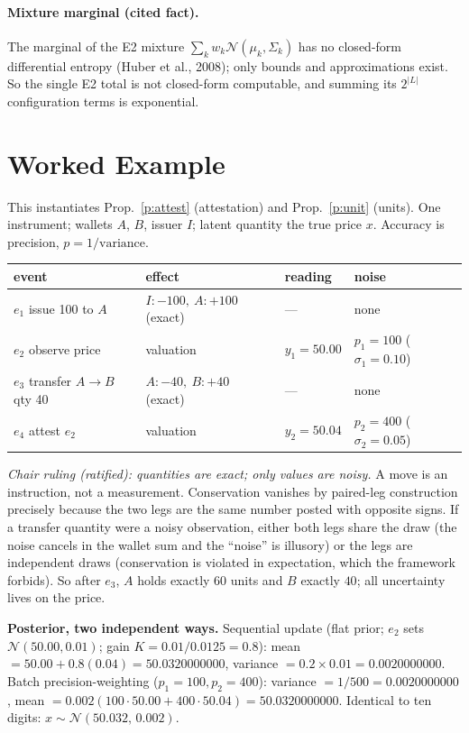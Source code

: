 \documentclass[11pt]{article}
\theoremstyle{definition}\newtheorem{definition}{Definition}
\theoremstyle{plain}\newtheorem{proposition}{Proposition}
\theoremstyle{remark}\newtheorem{remark}{Remark}
\newcommand{\Log}{L}
\newcommand{\ev}{e}                  %
\newcommand{\st}{x}                  %
\newcommand{\obs}{y}                 %
\newcommand{\acc}{p}                 %
\newcommand{\mean}{\mu}
\newcommand{\cov}{\Sigma}
\newcommand{\Ncal}{\mathcal{N}}
\begin{document}
\paragraph{Mixture marginal (cited fact).}
The marginal of the E2 mixture $\sum_k w_k\Ncal(\mean_k,\cov_k)$ has no closed-form differential
entropy (Huber et al., 2008); only bounds and approximations exist. So the single E2 total is
not closed-form computable, and summing its $2^{|\Log|}$ configuration terms is exponential.

\section{Worked Example}
This instantiates Prop.~\ref{p:attest} (attestation) and Prop.~\ref{p:unit} (units). One
instrument; wallets $A$, $B$, issuer $I$; latent quantity the true price $\st$. Accuracy is
precision, $\acc=1/\text{variance}$.

\vspace{-0.5em}\begin{center}\small
\begin{tabular}{llll}
\toprule
event & effect & reading & noise \\
\midrule
$\ev_1$ issue 100 to $A$ & $I:-100,\ A:+100$ (exact) & --- & none \\
$\ev_2$ observe price & valuation & $\obs_1=50.00$ & $\acc_1=100$ ($\sigma_1=0.10$) \\
$\ev_3$ transfer $A\!\to\!B$ qty 40 & $A:-40,\ B:+40$ (exact) & --- & none \\
$\ev_4$ attest $\ev_2$ & valuation & $\obs_2=50.04$ & $\acc_2=400$ ($\sigma_2=0.05$) \\
\bottomrule
\end{tabular}
\end{center}

\noindent\emph{Chair ruling (ratified): quantities are exact; only values are noisy.} A move is
an instruction, not a measurement. Conservation vanishes by paired-leg construction precisely
because the two legs are the same number posted with opposite signs. If a transfer quantity were
a noisy observation, either both legs share the draw (the noise cancels in the wallet sum and the
``noise'' is illusory) or the legs are independent draws (conservation is violated in
expectation, which the framework forbids). So after $\ev_3$, $A$ holds exactly $60$ units and $B$
exactly $40$; all uncertainty lives on the price.

\smallskip\noindent\textbf{Posterior, two independent ways.}
Sequential update (flat prior; $\ev_2$ sets $\Ncal(50.00,0.01)$; gain
$K=0.01/0.0125=0.8$): mean $=50.00+0.8(0.04)=\mathbf{50.0320000000}$, variance
$=0.2\times0.01=\mathbf{0.0020000000}$. Batch precision-weighting ($\acc_1=100,\acc_2=400$):
variance $=1/500=\mathbf{0.0020000000}$, mean $=0.002(100\cdot50.00+400\cdot50.04)=\mathbf{50.0320000000}$.
Identical to ten digits: $\st\sim\Ncal(50.032,\,0.002)$.
\end{document}
